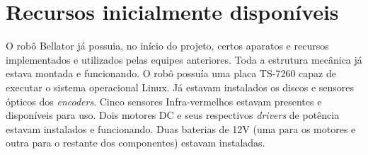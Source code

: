 \section{Recursos inicialmente disponíveis}

O robô Bellator já possuia, no início do projeto, certos aparatos e recursos implementados e utilizados pelas equipes anteriores. Toda a estrutura mecânica já estava montada e funcionando. O robô possuía uma placa TS-7260 capaz de executar o sistema operacional Linux. Já estavam instalados os discos e sensores ópticos dos \textit{encoders}. Cinco sensores Infra-vermelhos estavam presentes e disponíveis para uso. Dois motores DC e seus respectivos \textit{drivers} de potência estavam instalados e funcionando. Duas baterias de 12V (uma para os motores e outra para o restante dos componentes) estavam instaladas.




